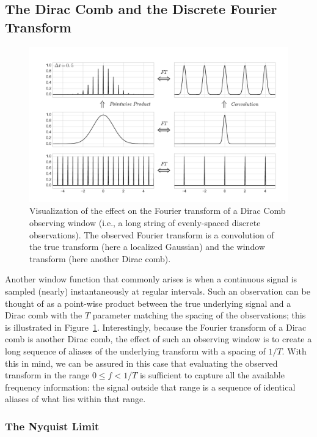 \documentclass[preprint]{aastex}
\newcommand{\fig}[1]{Figure~\ref{fig:#1}}
\newcommand{\figlabel}[1]{\label{fig:#1}}
\newcommand{\sectlabel}[1]{\label{sect:#1}}
\begin{document}
\subsection{The Dirac Comb and the Discrete Fourier Transform}

\begin{figure}[ht]
  \centering
  \includegraphics[width=\textwidth]{fig07_comb_window_1}
  \caption{Visualization of the effect on the Fourier transform of a
    Dirac Comb observing window (i.e., a long string of evenly-spaced
    discrete observations). The observed Fourier
    transform is a convolution of the true transform (here a localized
    Gaussian) and the window transform (here another Dirac comb).
    \figlabel{comb-window-1}}
\end{figure}

Another window function that commonly arises is when a continuous signal is
sampled (nearly) instantaneously at regular intervals.
Such an observation can be thought of as a point-wise product between the true
underlying signal and a Dirac comb with the $T$ parameter matching the spacing
of the observations; this is illustrated in \fig{comb-window-1}.
Interestingly, because the Fourier transform of a Dirac comb is another Dirac
comb, the effect of such an observing window is to create a long sequence
of aliases of the underlying transform with a spacing of $1/T$.
With this in mind, we can be assured in this case that evaluating the
observed transform in the range $0 \le f < 1/T$ is sufficient to capture
all the available frequency information:
the signal outside that range is a sequence of identical aliases of
what lies within that range.

\subsubsection{The Nyquist Limit}
\sectlabel{nyquist}
\end{document}
